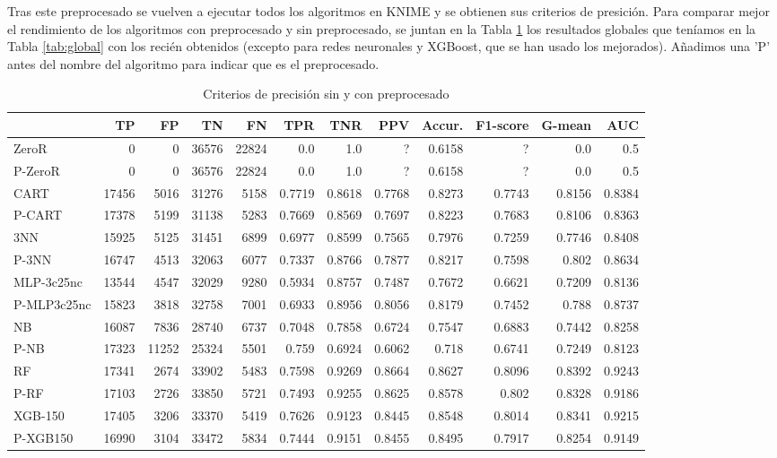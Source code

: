 \documentclass[a4paper, 20pt]{article}
\begin{document}
Tras este preprocesado se vuelven a ejecutar todos los algoritmos en KNIME y se obtienen sus criterios de presición. Para comparar mejor el rendimiento de los algoritmos con preprocesado y sin preprocesado, se juntan en la Tabla \ref{tab:preprocesado} los resultados globales que teníamos en la Tabla \ref{tab:global} con los recién obtenidos (excepto para redes neuronales y XGBoost, que se han usado los mejorados). Añadimos una 'P' antes del nombre del algoritmo para indicar que es el preprocesado.

\begin{table}[H]
\centering
\caption{Criterios de precisión sin y con preprocesado}
\label{tab:preprocesado}
\begin{tabular}{lrrrrrrrrrrr}
\toprule
 & TP & FP & TN & FN & TPR & TNR & PPV & Accur. & F1-score & G-mean & AUC\\ \midrule
ZeroR & 0 & 0 & 36576 & 22824 & 0.0 & 1.0 & ? & 0.6158 & ? & 0.0 & 0.5\\
P-ZeroR & 0 & 0 & 36576 & 22824 & 0.0 & 1.0 & ? & 0.6158 & ? & 0.0 & 0.5\\
CART & 17456 & 5016 & 31276 & 5158 & 0.7719 & 0.8618 & 0.7768 & 0.8273 & 0.7743 & 0.8156 & 0.8384\\
P-CART & 17378 & 5199 & 31138 & 5283 & 0.7669 & 0.8569 & 0.7697 & 0.8223 & 0.7683 & 0.8106 & 0.8363\\
3NN & 15925 & 5125 & 31451 & 6899 & 0.6977 & 0.8599 & 0.7565 & 0.7976 & 0.7259 & 0.7746 & 0.8408\\
P-3NN & 16747 & 4513 & 32063 & 6077 & 0.7337 & 0.8766 & 0.7877 & 0.8217 & 0.7598 & 0.802 & 0.8634\\
MLP-3c25nc & 13544 & 4547 & 32029 & 9280 & 0.5934 & 0.8757 & 0.7487 & 0.7672 & 0.6621 & 0.7209 & 0.8136\\
P-MLP3c25nc & 15823 & 3818 & 32758 & 7001 & 0.6933 & 0.8956 & 0.8056 & 0.8179 & 0.7452 & 0.788 & 0.8737\\
NB & 16087 & 7836 & 28740 & 6737 & 0.7048 & 0.7858 & 0.6724 & 0.7547 & 0.6883 & 0.7442 & 0.8258\\
P-NB & 17323 & 11252 & 25324 & 5501 & 0.759 & 0.6924 & 0.6062 & 0.718 & 0.6741 & 0.7249 & 0.8123\\
RF & 17341 & 2674 & 33902 & 5483 & 0.7598 & 0.9269 & 0.8664 & 0.8627 & 0.8096 & 0.8392 & 0.9243\\
P-RF & 17103 & 2726 & 33850 & 5721 & 0.7493 & 0.9255 & 0.8625 & 0.8578 & 0.802 & 0.8328 & 0.9186\\
XGB-150 & 17405 & 3206 & 33370 & 5419 & 0.7626 & 0.9123 & 0.8445 & 0.8548 & 0.8014 & 0.8341 & 0.9215\\
P-XGB150 & 16990 & 3104 & 33472 & 5834 & 0.7444 & 0.9151 & 0.8455 & 0.8495 & 0.7917 & 0.8254 & 0.9149\\
\bottomrule
\end{tabular}
\end{table}
\end{document}
